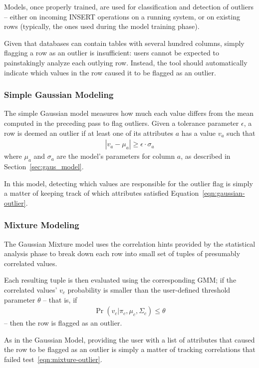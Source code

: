 Models, once properly trained, are used for classification and detection of outliers -- either on incoming INSERT operations on a running system, or on existing rows (typically, the ones used during the model training phase). %

Given that databases can contain tables with several hundred columns, simply flagging a row as an outlier is insufficient: users cannot be expected to painstakingly analyze each outlying row. Instead, the tool should automatically indicate which values in the row caused it to be flagged as an outlier.

\subsubsection{Simple Gaussian Modeling}
The simple Gaussian model measures how much each value differs from the mean computed in the preceding pass to flag outliers. Given a tolerance parameter $\epsilon$, a row is deemed an outlier if at least one of its attributes $a$ has a value $v_a$ such that 
\begin{align}
  |v_a - \mu_a| \ge \epsilon \cdot \sigma_a
  \label{eqn:gaussian-outlier}
\end{align}
where $\mu_a$ and $\sigma_a$ are the model's parameters for column $a$, as described in Section~\ref{sec:gaus_model}.

In this model, detecting which values are responsible for the outlier flag is simply a matter of keeping track of which attributes satisfied Equation~\ref{eqn:gaussian-outlier}.
 
\subsubsection{Mixture Modeling}
The Gaussian Mixture model uses the correlation hints provided by the statistical analysis phase to break down each row into small set of tuples of presumably correlated values.

Each resulting tuple is then evaluated using the corresponding GMM; if the correlated values' $v_c$ probability is smaller than the user-defined threshold parameter $\theta$ -- that is, if
\begin{align}
  \Pr(v_c | \pi_c, \mu_c, \Sigma_c) \leq \theta 
  \label{eqn:mixture-outlier}
\end{align}
 -- then the row is flagged as an outlier.

As in the Gaussian Model, providing the user with a list of attributes that caused the row to be flagged as an outlier is simply a matter of tracking correlations that failed test~\ref{eqn:mixture-outlier}.

